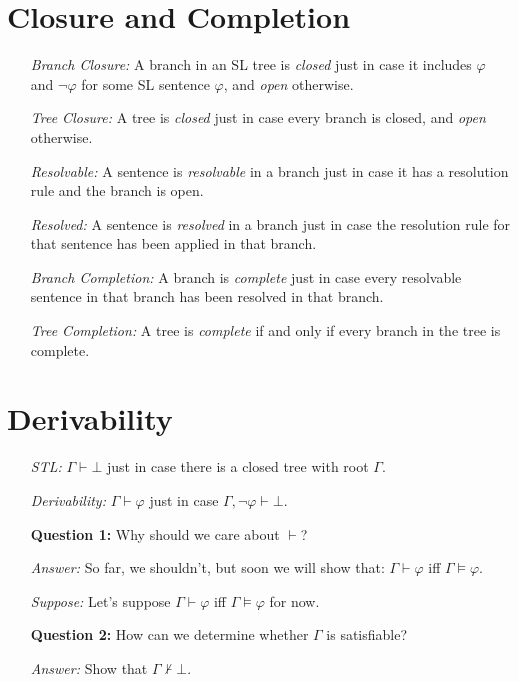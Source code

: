 \documentclass[a4paper, 11pt]{article} %
\begin{document}
\section*{Closure and Completion}

\begin{enumerate}
  \item[\it Branch Closure:] A branch in an SL tree is \textit{closed} just in case it includes $\varphi$ and $\neg \varphi$ for some SL sentence $\varphi$, and \textit{open} otherwise.
  \item[\it Tree Closure:] A tree is \textit{closed} just in case every branch is closed, and \textit{open} otherwise.
  \item[\it Resolvable:] A sentence is \textit{resolvable} in a branch just in case it has a resolution rule and the branch is open.
  \item[\it Resolved:] A sentence is \textit{resolved} in a branch just in case the resolution rule for that sentence has been applied in that branch.
  \item[\it Branch Completion:] A branch is \textit{complete} just in case every resolvable sentence in that branch has been resolved in that branch.
  \item[\it Tree Completion:] A tree is \textit{complete} if and only if every branch in the tree is complete.
\end{enumerate}




\section*{Derivability}

\begin{enumerate}
  \item[\it STL:] $\Gamma \vdash \bot$ just in case there is a closed tree with root $\Gamma$. 
  \item[\it Derivability:] $\Gamma \vdash \varphi$ just in case $\Gamma,\neg\varphi \vdash \bot$.
  \item[\bf Question 1:] Why should we care about $\vdash$?
  \item[\it Answer:] So far, we shouldn't, but soon we will show that: $\Gamma \vdash \varphi$ iff $\Gamma \vDash \varphi$. 
  \item[\it Suppose:] Let's suppose $\Gamma \vdash \varphi$ iff $\Gamma \vDash \varphi$ for now. 
  \item[\bf Question 2:] How can we determine whether $\Gamma$ is satisfiable?
  \item[\it Answer:] Show that $\Gamma \nvdash \bot$.
\end{enumerate}
\end{document}
